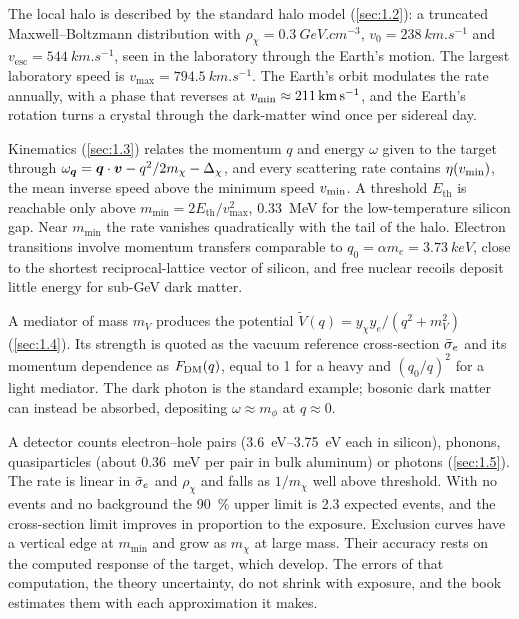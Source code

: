 The local halo is described by the standard halo model (\cref{sec:1.2}): a truncated Maxwell--Boltzmann distribution with $\rho_\chi = \SI{0.3}{GeV.cm^{-3}}$, $v_0 = \SI{238}{km.s^{-1}}$ and $v_{\mathrm{esc}} = \SI{544}{km.s^{-1}}$, seen in the laboratory through the Earth's motion. The largest laboratory speed is $v_{\mathrm{max}} = \SI{794.5}{km.s^{-1}}$. The Earth's orbit modulates the rate annually, with a phase that reverses at $v_{\mathrm{min}} \approx \SI{211}{km.s^{-1}}$, and the Earth's rotation turns a crystal through the dark-matter wind once per sidereal day.

Kinematics (\cref{sec:1.3}) relates the momentum $q$ and energy $\omega$ given to the target through $\omega_{\bm{q}} = \bm{q}\cdot\bm{v} - q^2/2m_\chi - \Delta_\chi$, and every scattering rate contains $\eta(v_{\mathrm{min}})$, the mean inverse speed above the minimum speed $v_{\mathrm{min}}$. A threshold $E_{\mathrm{th}}$ is reachable only above $m_{\mathrm{min}} = 2E_{\mathrm{th}}/v_{\mathrm{max}}^2$, \SI{0.33}{MeV} for the low-temperature silicon gap. Near $m_{\mathrm{min}}$ the rate vanishes quadratically with the tail of the halo. Electron transitions involve momentum transfers comparable to $q_0 = \alpha m_e = \SI{3.73}{keV}$, close to the shortest reciprocal-lattice vector of silicon, and free nuclear recoils deposit little energy for sub-GeV dark matter.

A mediator of mass $m_V$ produces the potential $\tilde V(q) = y_\chi y_e/(q^2 + m_V^2)$ (\cref{sec:1.4}). Its strength is quoted as the vacuum reference cross-section $\bar{\sigma}_{e}$ and its momentum dependence as $F_{\mathrm{DM}}(q)$, equal to 1 for a heavy and $(q_0/q)^2$ for a light mediator. The dark photon is the standard example; bosonic dark matter can instead be absorbed, depositing $\omega \approx m_\phi$ at $q \approx 0$.

A detector counts electron--hole pairs (\SIrange{3.6}{3.75}{eV} each in silicon), phonons, quasiparticles (about \SI{0.36}{meV} per pair in bulk aluminum) or photons (\cref{sec:1.5}). The rate is linear in $\bar{\sigma}_{e}$ and $\rho_\chi$ and falls as $1/m_\chi$ well above threshold. With no events and no background the \SI{90}{\percent} upper limit is 2.3 expected events, and the cross-section limit improves in proportion to the exposure. Exclusion curves have a vertical edge at $m_{\mathrm{min}}$ and grow as $m_\chi$ at large mass. Their accuracy rests on the computed response of the target, which  develop. The errors of that computation, the theory uncertainty, do not shrink with exposure, and the book estimates them with each approximation it makes.
